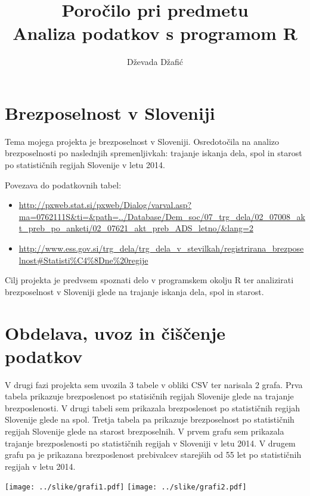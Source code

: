 \documentclass[11pt,a4paper]{article}
\begin{document}
\title{Poročilo pri predmetu \\
Analiza podatkov s programom R}
\author{Dževada Džafić}
\maketitle

\section{Brezposelnost v Sloveniji}

Tema mojega projekta je brezposelnost v Sloveniji. Osredotočila na analizo brezposelnosti po naslednjih spremenljivkah: trajanje iskanja dela, spol in starost po statističnih regijah Slovenije v letu 2014.

Povezava do podatkovnih tabel:
\begin{itemize}

\item \url{http://pxweb.stat.si/pxweb/Dialog/varval.asp?ma=0762111S&ti=&path=../Database/Dem_soc/07_trg_dela/02_07008_akt_preb_po_anketi/02_07621_akt_preb_ADS_letno/&lang=2}
\item \url{http://www.ess.gov.si/trg_dela/trg_dela_v_stevilkah/registrirana_brezposelnost#Statisti%C4%8Dne%20regije}

\end{itemize}

Cilj projekta je predvsem spoznati delo v programskem okolju R ter analizirati brezposelnost v Sloveniji glede na trajanje iskanja dela, spol in starost.


\section{Obdelava, uvoz in čiščenje podatkov}

V drugi fazi projekta sem uvozila 3 tabele v obliki CSV ter narisala 2 grafa.
Prva tabela prikazuje brezposlenost po statisičnih regijah Slovenije glede na trajanje brezposlenosti.
V drugi tabeli sem prikazala brezposlenost po statističnih regijah Slovenije glede na spol. Tretja tabela pa prikazuje brezposelnost po statističnih regijah Slovenije glede na starost brezposelnih.
V prvem grafu sem prikazala trajanje brezposlenosti po statističnih regijah v Sloveniji v letu 2014. V drugem grafu pa je prikazana brezposlenost prebivalcev starejših od 55 let po statističnih regijah v letu 2014.

\texttt{[image: ../slike/grafi1.pdf]}
\texttt{[image: ../slike/grafi2.pdf]}
\newpage
\end{document}
